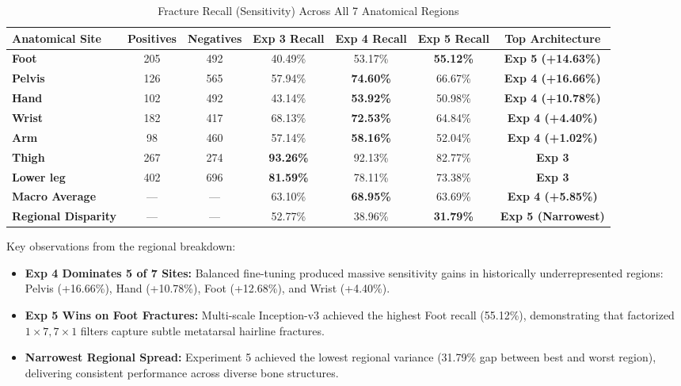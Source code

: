 \documentclass[12pt, a4paper]{report}
\begin{document}
\begin{table}[H]
\centering
\caption{Fracture Recall (Sensitivity) Across All 7 Anatomical Regions}
\label{tab:region_recall}
\begin{tabular}{lcccccc}
\toprule
\textbf{Anatomical Site} & \textbf{Positives} & \textbf{Negatives} & \textbf{Exp 3 Recall} & \textbf{Exp 4 Recall} & \textbf{Exp 5 Recall} & \textbf{Top Architecture} \\
\midrule
\textbf{Foot} & 205 & 492 & 40.49\% & 53.17\% & \textbf{55.12\%} & \textbf{Exp 5 (+14.63\%)} \\
\textbf{Pelvis} & 126 & 565 & 57.94\% & \textbf{74.60\%} & 66.67\% & \textbf{Exp 4 (+16.66\%)} \\
\textbf{Hand} & 102 & 492 & 43.14\% & \textbf{53.92\%} & 50.98\% & \textbf{Exp 4 (+10.78\%)} \\
\textbf{Wrist} & 182 & 417 & 68.13\% & \textbf{72.53\%} & 64.84\% & \textbf{Exp 4 (+4.40\%)} \\
\textbf{Arm} & 98 & 460 & 57.14\% & \textbf{58.16\%} & 52.04\% & \textbf{Exp 4 (+1.02\%)} \\
\textbf{Thigh} & 267 & 274 & \textbf{93.26\%} & 92.13\% & 82.77\% & \textbf{Exp 3} \\
\textbf{Lower leg} & 402 & 696 & \textbf{81.59\%} & 78.11\% & 73.38\% & \textbf{Exp 3} \\
\midrule
\textbf{Macro Average} & — & — & 63.10\% & \textbf{68.95\%} & 63.69\% & \textbf{Exp 4 (+5.85\%)} \\
\textbf{Regional Disparity} & — & — & 52.77\% & 38.96\% & \textbf{31.79\%} & \textbf{Exp 5 (Narrowest)} \\
\bottomrule
\end{tabular}
\end{table}

Key observations from the regional breakdown:
\begin{itemize}[leftmargin=*]
    \item \textbf{Exp 4 Dominates 5 of 7 Sites:} Balanced fine-tuning produced massive sensitivity gains in historically underrepresented regions: Pelvis (+16.66\%), Hand (+10.78\%), Foot (+12.68\%), and Wrist (+4.40\%).
    \item \textbf{Exp 5 Wins on Foot Fractures:} Multi-scale Inception-v3 achieved the highest Foot recall (55.12\%), demonstrating that factorized $1\times 7, 7\times 1$ filters capture subtle metatarsal hairline fractures.
    \item \textbf{Narrowest Regional Spread:} Experiment 5 achieved the lowest regional variance (31.79\% gap between best and worst region), delivering consistent performance across diverse bone structures.
\end{itemize}
\end{document}
